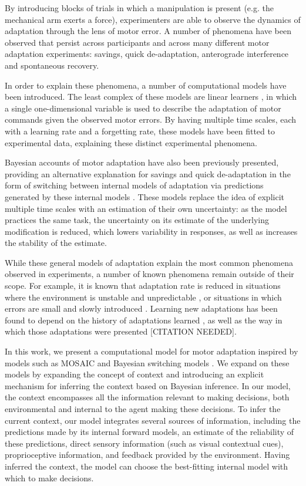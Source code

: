 \documentclass[a4paper,doc,floatsintext,natbib]{apa6}
\begin{document}
By introducing blocks of trials in which a manipulation is present (e.g. the mechanical arm exerts a force), experimenters are able to observe the dynamics of adaptation through the lens of motor error. A number of phenomena have been observed that persist across participants and across many different motor adaptation experiments: savings, quick de-adaptation, anterograde interference and spontaneous recovery.

In order to explain these phenomena, a number of computational models have been introduced. The least complex of these models are linear learners \citep[e.g.][]{Smith_Interacting_2006,Forano_Timescales_2020,Scheidt_Learning_2001}, in which a single one-dimensional variable is used to describe the adaptation of motor commands given the observed motor errors. By having multiple time scales, each with a learning rate and a forgetting rate, these models have been fitted to experimental data, explaining these distinct experimental phenomena.

Bayesian accounts of motor adaptation have also been previously presented, providing an alternative explanation for savings and quick de-adaptation in the form of switching between internal models of adaptation via predictions generated by these internal models \citep{Kording_Bayesian_2004,Oh_Minimizing_2019}. These models replace the idea of explicit multiple time scales with an estimation of their own uncertainty: as the model practices the same task, the uncertainty on its estimate of the underlying modification is reduced, which lowers variability in responses, as well as increases the stability of the estimate.

While these general models of adaptation explain the most common phenomena observed in experiments, a number of known phenomena remain outside of their scope. For example, it is known that adaptation rate is reduced in situations where the environment is unstable and unpredictable \citep{Herzfeld_memory_2014}, or situations in which errors are small \citep{Marko_Sensitivity_2012} and slowly introduced \citep{Huang_Persistence_2009}. Learning new adaptations has been found to depend on the history of adaptations learned \citep{Vaswani_Decay_2013}, as well as the way in which those adaptations were presented [CITATION NEEDED]. 

In this work, we present a computational model for motor adaptation inspired by models such as MOSAIC \citep{Wolpert_Multiple_1998} and Bayesian switching models \citep{Kording_Bayesian_2004,Oh_Minimizing_2019}. We expand on these models by expanding the concept of context and introducing an explicit mechanism for inferring the context based on Bayesian inference. In our model, the context encompasses all the information relevant to making decisions, both environmental and internal to the agent making these decisions. To infer the current context, our model integrates several sources of information, including the predictions made by its internal forward models, an estimate of the reliability of these predictions, direct sensory information (such as visual contextual cues), proprioceptive information, and feedback provided by the environment. Having inferred the context, the model can choose the best-fitting internal model with which to make decisions.
\end{document}
